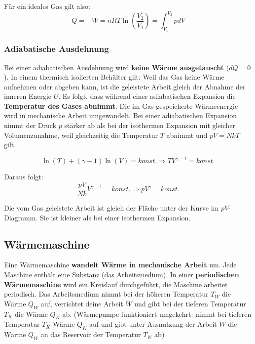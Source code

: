 \documentclass[11pt]{article}
\begin{document}
F{\"u}r ein ideales Gas gilt also:
\begin{equation*}
	Q = -W = nRT\ln(\frac{V_2}{V_1}) = \int_{V_1}^{V_2}pdV
\end{equation*}

\subsubsection{Adiabatische Ausdehnung}

Bei einer adiabatischen Ausdehnung wird \textbf{keine W{\"a}rme ausgetauscht} ($dQ = 0$).\newline
In einem thermisch isolierten Beh{\"a}lter gilt: Weil das Gas keine W{\"a}rme aufnehmen oder abgeben kann, ist die geleistete Arbeit gleich der Abnahme der inneren Energie $U$. \newline
Es folgt, dass w{\"a}hrend einer adiabatischen Expansion die \textbf{Temperatur des Gases abnimmt}. Die im Gas gespeicherte W{\"a}rmeenergie wird in mechanische Arbeit umgewandelt. \newline
Bei einer adiabatischen Expansion nimmt der Druck $p$ st{\"a}rker ab als bei der isothermen Expansion mit gleicher Volumenzunahme, weil gleichzeitig die Temperatur $T$ abnimmt und $pV = NkT$ gilt.

\begin{equation*}
	\ln(T) + (\gamma - 1) \ln(V) = konst. \Rightarrow TV^{\gamma - 1} = konst.
\end{equation*}

Daraus folgt:
\begin{equation*}
	\frac{pV}{Nk}V^{\gamma-1} = konst. \Rightarrow pV^\gamma = konst.
\end{equation*}

Die vom Gas geleistete Arbeit ist gleich der Fl{\"a}che unter der Kurve im $pV$-Diagramm. Sie ist kleiner als bei einer isothermen Expansion.

\subsection{W{\"a}rmemaschine}

Eine W{\"a}rmemaschine \textbf{wandelt W{\"a}rme in mechanische Arbeit} um. Jede Maschine enth{\"a}lt eine Substanz (das Arbeitsmedium). \newline
In einer \textbf{periodischen W{\"a}rmemaschine} wird ein Kreislauf durchgef{\"u}hrt, die Maschine arbeitet periodisch. Das Arbeitsmedium nimmt bei der h{\"o}heren Temperatur $T_W$ die W{\"a}rme $Q_W$ auf, verrichtet deine Arbeit $W$ und gibt bei der tieferen Temperatur $T_K$ die W{\"a}rme $Q_K$ ab. (W{\"a}rmepumpe funktioniert umgekehrt: nimmt bei tieferen Temperatur $T_K$ W{\"a}rme $Q_K$ auf und gibt unter Ausnutzung der Arbeit $W$ die W{\"a}rme $Q_W$ an das Reservoir der Temperatur $T_W$ ab) \newline
\end{document}
